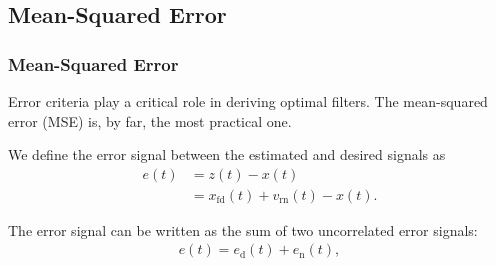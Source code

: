 \documentclass[10pt,pdflatex,headrule,landscape]{beamer}
\begin{document}
\subsection{Mean-Squared Error}
\begin{frame}
 \frametitle{Mean-Squared Error}

Error criteria play a critical role in deriving optimal filters.
The mean-squared error (MSE) \cite{C2-haykin2002} is, by far, the most practical one.

We define the error signal between the estimated and desired signals as
\begin{align}
\label{C2-error}
 e(t) &= z(t) - x(t) \\
 &= x_{\mathrm{fd}}(t) + v_{\mathrm{rn}}(t) - x(t). \nonumber
\end{align}

The error signal can be written as the sum of two uncorrelated error signals:
\begin{eqnarray}
\label{C2-error-2}
 e(t) = e_{\mathrm{d}}(t) + e_{\mathrm{n}}(t),
\end{eqnarray}

\end{frame}
\end{document}
